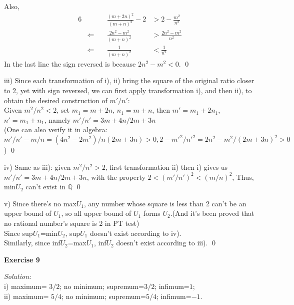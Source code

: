 \documentclass[12pt]{article}
\begin{document}
Also, 
\begin{alignat*}{6}
&\quad &\frac{(m+2n)^2}{(m+n)^2}-2&>2-\frac{m^2}{n^2}\\
&\Longleftarrow \quad&\frac{2n^2-m^2}{(m+n)^2}&>\frac{2n^2-m^2}{n^2} \\
&\Longleftarrow &\frac{1}{(m+n)^2}&<\frac{1}{n^2}
\end{alignat*}
In the last line the sign reversed is because $2n^2-m^2<0$.
\qed
\par
iii) Since each transformation of i), ii) bring the square of the original ratio closer to 2, yet with sign reversed, we can first apply transformation i), and then ii), to obtain the desired construction of $m'/n'$:\\
Given $m^2/n^2<2$, set $m_1=m+2n$, $n_1=m+n$, then $m'=m_1+2n_1$, $n'=m_1+n_1$, namely $m'/n'=3m+4n/2m+3n$\\
(One can also verify it in algebra: $m'/n'-m/n=(4n^2-2m^2)/n(2m+3n)>0, 2- m'^2/n'^2=2n^2-m^2/(2m+3n)^2>0$)
\qed
\par
iv) Same as iii): given $m^2/n^2>2$, first transformation ii) then i) gives us  $m'/n'=3m+4n/2m+3n$, with the property $2<(m'/n')^2<(m/n)^2$, 
Thus,  min$U_2$ can't exist in $\mathbb{Q}$
\qed
\par
v) Since there's no max$U_1$, any number whose square is less than 2 can't be an upper bound of $U_1$, so all upper bound of $U_1$ forms $U_2$.(And it's been proved that no rational number's square is 2 in PT test)\\
Since sup$U_1$=min$U_2$, sup$U_1$ doesn't exist according to iv).\\
Similarly, since  inf$U_2$=max$U_1$, inf$U_2$ doesn't exist according to iii).
\qed
\par

\textbf{Exercise 9}\par
\textit{Solution: } \\
i) maximum= $3/2$;
no minimum;
supremum=$3/2$;
infimum=$1$;\\
ii) maximum= $5/4$;
no minimum;
supremum=$5/4$;
infimum=$-1$.
 \par
 
\end{document}
